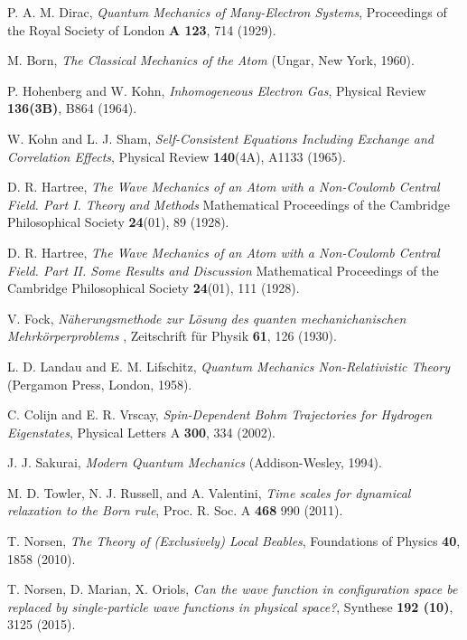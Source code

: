 \documentclass[nofootinbib, secnumarabic, amsmath, nobibnotes,10pt,aps,pra]{revtex4-1}
\begin{document}
\begin{thebibliography}{999}
P. A. M. Dirac, \emph{Quantum Mechanics of Many-Electron Systems}, Proceedings of the Royal Society of London \textbf{A 123},  714 (1929).

M. Born, \emph{The Classical Mechanics of the Atom} (Ungar, New York, 1960).

P. Hohenberg and W. Kohn, \emph{Inhomogeneous Electron Gas}, Physical Review {\bf 136(3B)},  B864 (1964).

W. Kohn and L. J. Sham, \emph{Self-Consistent Equations Including Exchange and Correlation Effects}, Physical Review \textbf{140}(4A),  A1133  (1965).

D. R. Hartree, \emph{The Wave Mechanics of an Atom with a Non-Coulomb Central Field. Part I. Theory and Methods} Mathematical Proceedings of the Cambridge Philosophical Society  \textbf{24}(01),  89 (1928).

D. R. Hartree, \emph{The Wave Mechanics of an Atom with a Non-Coulomb Central Field. Part II. Some Results and Discussion} Mathematical Proceedings of the Cambridge Philosophical Society \textbf{24}(01),  111 (1928).

V. Fock, \emph{N\"{a}herungsmethode zur L\"{o}sung des quanten mechanichanischen Mehrk\"{o}rperproblems
}, Zeitschrift f\"{u}r Physik \textbf{61},  126 (1930).

L. D. Landau and E. M. Lifschitz, \emph{Quantum Mechanics Non-Relativistic Theory} (Pergamon Press, London, 1958).

C. Colijn and E. R. Vrscay, \emph{Spin-Dependent Bohm Trajectories for Hydrogen Eigenstates}, Physical Letters A \textbf{300}, 334 (2002).

J. J. Sakurai, \emph{Modern Quantum Mechanics} (Addison-Wesley, 1994).

 M. D. Towler, N. J. Russell, and A. Valentini, \emph{Time scales for dynamical relaxation to the Born rule}, Proc. R. Soc. A \textbf{468}  990 (2011).

T. Norsen, \textit{The Theory of (Exclusively) Local Beables}, Foundations of Physics \textbf{40}, 1858 (2010).

 T. Norsen, D. Marian, X. Oriols, \emph{Can the wave function in configuration space be replaced by single-particle wave functions in physical space?}, Synthese \textbf{192 (10)},  3125 (2015).


\end{thebibliography}
\end{document}
